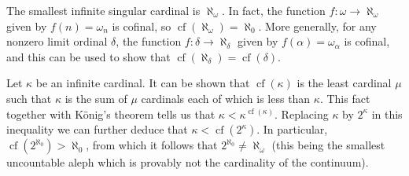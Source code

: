 \documentclass{article}
\def\cf#1{\operatorname{cf}(#1)}
\begin{document}
The smallest infinite singular cardinal is $\aleph_{\omega}$.
In fact, the function $f\colon\omega\to\aleph_{\omega}$ given by $f(n)=\omega_n$ is cofinal, so $\cf{\aleph_\omega}=\aleph_0$.
More generally, for any nonzero limit ordinal $\delta$, the function $f\colon\delta\to\aleph_\delta$ given by $f(\alpha)=\omega_\alpha$ is cofinal, and this can be used to show that $\cf{\aleph_\delta}=\cf{\delta}$.

Let $\kappa$ be an infinite cardinal.
It can be shown that $\cf{\kappa}$ is 
the least cardinal $\mu$ such that $\kappa$ is 
the sum of $\mu$ cardinals each of which is less than $\kappa$.
This fact together with K\"onig's theorem tells us that  
$\kappa<\kappa^{\cf{\kappa}}$.
Replacing $\kappa$ by $2^\kappa$ in this inequality 
we can further deduce that $\kappa<\cf{2^\kappa}$.
In particular, $\cf{2^{\aleph_0}}>\aleph_0$, from which it follows that $2^{\aleph_0}\neq\aleph_\omega$ (this being the smallest uncountable aleph which is provably not the cardinality of the continuum).
\end{document}
